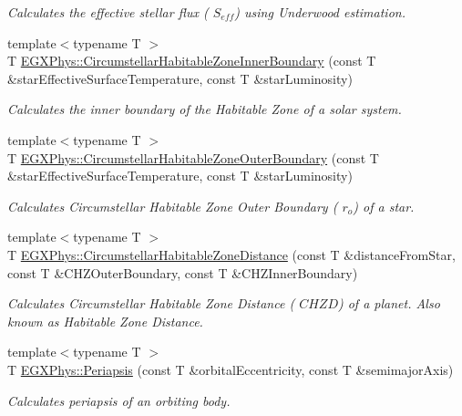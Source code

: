 \begin{DoxyCompactItemize}
\begin{DoxyCompactList}\small\item\em Calculates the effective stellar flux ( $S_{eff}$) using Underwood estimation. \end{DoxyCompactList}\item 
{\footnotesize template$<$typename T $>$ }\\T \hyperlink{group___astrophysics_ga9ee2e8023cb444aa4638c962788b5853}{E\+G\+X\+Phys\+::\+Circumstellar\+Habitable\+Zone\+Inner\+Boundary} (const T \&star\+Effective\+Surface\+Temperature, const T \&star\+Luminosity)
\begin{DoxyCompactList}\small\item\em Calculates the inner boundary of the Habitable Zone of a solar system. \end{DoxyCompactList}\item 
{\footnotesize template$<$typename T $>$ }\\T \hyperlink{group___astrophysics_gaa47fcde814ba8007de800e930fc0a08d}{E\+G\+X\+Phys\+::\+Circumstellar\+Habitable\+Zone\+Outer\+Boundary} (const T \&star\+Effective\+Surface\+Temperature, const T \&star\+Luminosity)
\begin{DoxyCompactList}\small\item\em Calculates Circumstellar Habitable Zone Outer Boundary ( $r_o$) of a star. \end{DoxyCompactList}\item 
{\footnotesize template$<$typename T $>$ }\\T \hyperlink{group___astrophysics_gacf3a720793cdb27f6d93b170b44e81be}{E\+G\+X\+Phys\+::\+Circumstellar\+Habitable\+Zone\+Distance} (const T \&distance\+From\+Star, const T \&C\+H\+Z\+Outer\+Boundary, const T \&C\+H\+Z\+Inner\+Boundary)
\begin{DoxyCompactList}\small\item\em Calculates Circumstellar Habitable Zone Distance ( $CHZD$) of a planet. Also known as Habitable Zone Distance. \end{DoxyCompactList}\item 
{\footnotesize template$<$typename T $>$ }\\T \hyperlink{group___astrophysics_ga4414ac75539371ec874a3d25cad6c9fe}{E\+G\+X\+Phys\+::\+Periapsis} (const T \&orbital\+Eccentricity, const T \&semimajor\+Axis)
\begin{DoxyCompactList}\small\item\em Calculates periapsis of an orbiting body. \end{DoxyCompactList}\item 

\end{DoxyCompactItemize}
